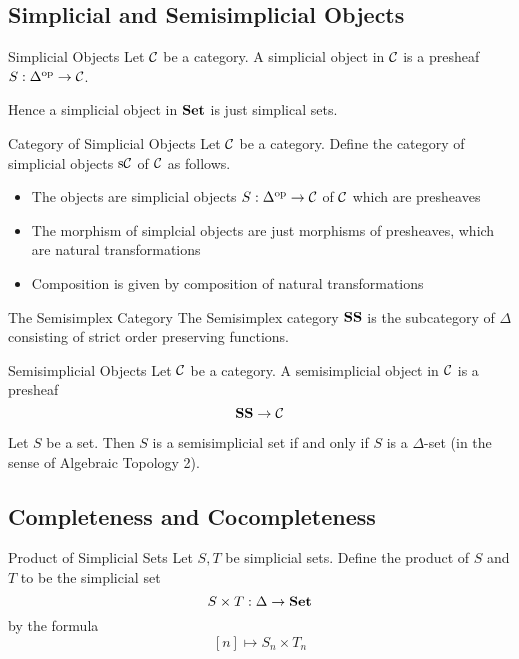 \documentclass[a4paper]{article}
\begin{document}
\subsection{Simplicial and Semisimplicial Objects}
\begin{defn}{Simplicial Objects}{} Let $\mathcal{C}$ be a category. A simplicial object in $\mathcal{C}$ is a presheaf $S:\Delta^\text{op}\to\mathcal{C}$. 
\end{defn}

Hence a simplicial object in $\bold{Set}$ is just simplical sets. 

\begin{defn}{Category of Simplicial Objects}{} Let $\mathcal{C}$ be a category. Define the category of simplicial objects $\text{s}\mathcal{C}$ of $\mathcal{C}$ as follows. 
\begin{itemize}
\item The objects are simplicial objects $S:\Delta^\text{op}\to\mathcal{C}$ of $\mathcal{C}$ which are presheaves
\item The morphism of simplcial objects are just morphisms of presheaves, which are natural transformations
\item Composition is given by composition of natural transformations
\end{itemize}
\end{defn}

\begin{defn}{The Semisimplex Category}{} The Semisimplex category $\bold{SS}$ is the subcategory of $\Delta$ consisting of strict order preserving functions. 
\end{defn}

\begin{defn}{Semisimplicial Objects}{} Let $\mathcal{C}$ be a category. A semisimplicial object in $\mathcal{C}$ is a presheaf $$\bold{SS}\to\mathcal{C}$$
\end{defn}

\begin{lmm}{}{} Let $S$ be a set. Then $S$ is a semisimplicial set if and only if $S$ is a $\Delta$-set (in the sense of Algebraic Topology 2). 
\end{lmm}
\subsection{Completeness and Cocompleteness}
\begin{defn}{Product of Simplicial Sets}{} Let $S,T$ be simplicial sets. Define the product of $S$ and $T$ to be the simplicial set $$S\times T:\Delta\to\bold{Set}$$ by the formula $$[n]\mapsto S_n\times T_n$$
\end{defn}
\end{document}
